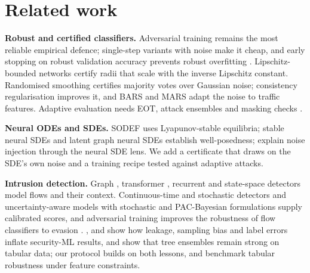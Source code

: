 \documentclass{article}
\theoremstyle{definition}
\begin{document}
\section{Related work}\label{sec:related}
\textbf{Robust and certified classifiers.} Adversarial training
\citep{madry2018pgd,zhang2019trades} remains the most reliable empirical
defence; single-step variants with noise \citep{dejorge2022nfgsm} make it
cheap, and early stopping on robust validation accuracy prevents robust
overfitting \citep{rice2020overfitting}. Lipschitz-bounded networks
\citep{tsuzuku2018lipschitz,anil2019sorting,araujo2023sll} certify radii that
scale with the inverse Lipschitz constant. Randomised smoothing
\citep{cohen2019smoothing,salman2019smoothadv,yang2020smoothing} certifies
majority votes over Gaussian noise; consistency regularisation
\citep{jeong2020consistency} improves it, and BARS \citep{wang2023bars} and
MARS \citep{huang2025mars} adapt the noise to traffic features. Adaptive
evaluation needs EOT, attack ensembles and masking checks
\citep{athalye2018obfuscated,croce2020autoattack,carlini2019evaluating}.

\textbf{Neural ODEs and SDEs.} SODEF \citep{kang2021sodef} uses Lyapunov-stable
equilibria; stable neural SDEs \citep{oh2024stablesde} and latent graph neural
SDEs \citep{bergna2024lgnsde} establish well-posedness;
\citet{liu2020sdenoise} explain noise injection through the neural SDE lens. We
add a certificate that draws on the SDE's own noise and a training recipe tested
against adaptive attacks.

\textbf{Intrusion detection.} Graph \citep{lo2022egraphsage}, transformer
\citep{wu2022rtids}, recurrent \citep{halbouni2022cnnlstm} and state-space
\citep{benatitallah2026graphmamba} detectors model flows and their context.
Continuous-time and stochastic detectors
\citep{anaedevha2026ode,anaedevha2026mstgnn} and uncertainty-aware models with
stochastic and PAC-Bayesian formulations
\citep{anaedevha2025stochtx,anaedevha2026pacbayes} supply calibrated scores, and
adversarial training improves the robustness of flow classifiers to evasion
\citep{anaedevha2024robust}.
\citet{arp2022dos}, \citet{pendlebury2019tesseract} and
\citet{engelen2021troubleshooting} show how leakage, sampling bias and label
errors inflate security-ML results, and \citet{grinsztajn2022trees} show that
tree ensembles remain strong on tabular data; our protocol builds on both
lessons, and \citet{simonetto2024tabularbench} benchmark tabular robustness
under feature constraints.
\end{document}
